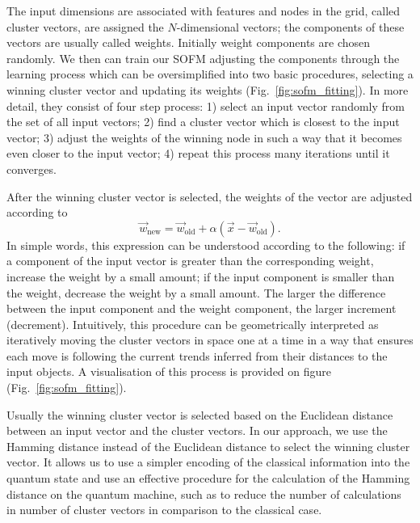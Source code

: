 \documentclass[pra,showkeys,twocolumn,showpacs]{revtex4-1}
\begin{document}
The input dimensions are associated with features and nodes in the grid, called cluster vectors, are assigned the $N$-dimensional vectors; 
the components of these vectors are usually called weights. 
Initially weight components are chosen randomly. 
We then can train our SOFM adjusting the components through the learning process which can be oversimplified into two basic procedures, 
selecting a winning cluster vector and updating its weights (Fig.~\ref{fig:sofm_fitting}). 
In more detail, they consist of four step process: 
1) select an input vector randomly from the set of all input vectors; 
2) find a cluster vector which is closest to the input vector; 
3) adjust the weights of the winning node in such a way that it becomes even closer to the input vector; 
4) repeat this process many iterations until it converges.


After the winning cluster vector is selected, the weights of the vector are adjusted according to 
%
\begin{equation}
    \label{eq:learning}
    \vec w_{\mathrm{new}} =
		\vec{w}_{\mathrm{old}} 
        + \alpha\left(\vec{x} - \vec w_{\mathrm{old}}\right)  .
\end{equation}
%
In simple words, this expression can be understood according to the following: 
if a component of the input vector is greater than the corresponding weight, increase the weight by a small amount; 
if the input component is smaller than the weight, decrease the
weight by a small amount. 
The larger the difference between the input component and the weight component, the larger increment (decrement). 
Intuitively, this procedure can be geometrically interpreted as iteratively moving the cluster vectors in space one at a time in a way that ensures each move is following the current trends inferred from their distances to the input objects. 
A visualisation of this process is provided on figure (Fig.~\ref{fig:sofm_fitting}).

Usually the winning cluster vector is selected based on the Euclidean distance between an input vector and the cluster vectors. 
In our approach, we use the Hamming distance instead of the Euclidean distance to select the winning cluster vector. 
It allows us to use a simpler encoding of the classical information into the quantum state and use an effective procedure for the calculation of the Hamming distance on the quantum machine, 
such as to reduce the number of calculations in number of cluster vectors in comparison to the classical case.
\end{document}
